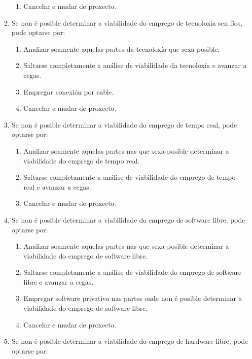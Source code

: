 \begin{enumerate}
\begin{enumerate}
         \item Cancelar e mudar de proxecto.
        \end{enumerate}
  \item Se non é posible determinar a viabilidade do emprego de tecnoloxía sen
        fíos, pode optarse por:
        \begin{enumerate}
         \item Analizar soamente aquelas partes da tecnoloxía que sexa posible.
         \item Saltarse completamente a análise de viabilidade da tecnoloxía e
               avanzar a cegas.
         \item Empregar conexión por cable.
         \item Cancelar e mudar de proxecto.
        \end{enumerate}
  \item Se non é posible determinar a viabilidade do emprego de tempo real,
        pode optarse por:
        \begin{enumerate}
         \item Analizar soamente aquelas partes nas que sexa posible determinar
               a viabilidade do emprego de tempo real.
         \item Saltarse completamente a análise de viabilidade do emprego de
               tempo real e avanzar a cegas.
         \item Cancelar e mudar de proxecto.
        \end{enumerate}
  \item Se non é posible determinar a viabilidade do emprego de software libre,
        pode optarse por:
        \begin{enumerate}
         \item Analizar soamente aquelas partes nas que sexa posible determinar
               a viabilidade do emprego de software libre.
         \item Saltarse completamente a análise de viabilidade do emprego de
               software libre e avanzar a cegas.
         \item Empregar software privativo nas partes onde non é posible
               determinar a viabilidade do emprego de software libre.
         \item Cancelar e mudar de proxecto.
        \end{enumerate}
  \item Se non é posible determinar a viabilidade do emprego de hardware libre,
        pode optarse por:
        \begin{enumerate}

\end{enumerate}
\end{enumerate}
